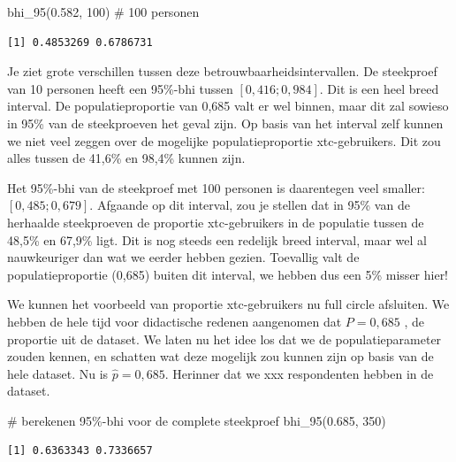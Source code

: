 \documentclass[
  letterpaper,
  DIV=11,
  numbers=noendperiod]{scrreprt}
\newenvironment{Shaded}{\begin{snugshade}}{\end{snugshade}}
\newcommand{\CommentTok}[1]{\textcolor[rgb]{0.37,0.37,0.37}{#1}}
\newcommand{\DecValTok}[1]{\textcolor[rgb]{0.68,0.00,0.00}{#1}}
\newcommand{\FloatTok}[1]{\textcolor[rgb]{0.68,0.00,0.00}{#1}}
\newcommand{\FunctionTok}[1]{\textcolor[rgb]{0.28,0.35,0.67}{#1}}
\newcommand{\NormalTok}[1]{\textcolor[rgb]{0.00,0.23,0.31}{#1}}
\begin{document}
\begin{Shaded}
\begin{Highlighting}[]
\FunctionTok{bhi\_95}\NormalTok{(}\FloatTok{0.582}\NormalTok{, }\DecValTok{100}\NormalTok{) }\CommentTok{\# 100 personen}
\end{Highlighting}
\end{Shaded}

\begin{verbatim}
[1] 0.4853269 0.6786731
\end{verbatim}

Je ziet grote verschillen tussen deze betrouwbaarheidsintervallen. De
steekproef van 10 personen heeft een 95\%-bhi tussen \([0,416; 0,984]\).
Dit is een heel breed interval. De populatieproportie van 0,685 valt er
wel binnen, maar dit zal sowieso in 95\% van de steekproeven het geval
zijn. Op basis van het interval zelf kunnen we niet veel zeggen over de
mogelijke populatieproportie xtc-gebruikers. Dit zou alles tussen de
41,6\% en 98,4\% kunnen zijn.

Het 95\%-bhi van de steekproef met 100 personen is daarentegen veel
smaller: \([0,485; 0,679]\). Afgaande op dit interval, zou je stellen
dat in 95\% van de herhaalde steekproeven de proportie xtc-gebruikers in
de populatie tussen de 48,5\% en 67,9\% ligt. Dit is nog steeds een
redelijk breed interval, maar wel al nauwkeuriger dan wat we eerder
hebben gezien. Toevallig valt de populatieproportie (0,685) buiten dit
interval, we hebben dus een 5\% misser hier!

We kunnen het voorbeeld van proportie xtc-gebruikers nu full circle
afsluiten. We hebben de hele tijd voor didactische redenen aangenomen
dat \(P=0,685\) , de proportie uit de dataset. We laten nu het idee los
dat we de populatieparameter zouden kennen, en schatten wat deze
mogelijk zou kunnen zijn op basis van de hele dataset. Nu is
\(\hat{p}=0,685\). Herinner dat we xxx respondenten hebben in de
dataset.

\begin{Shaded}
\begin{Highlighting}[]
\CommentTok{\# berekenen 95\%{-}bhi voor de complete steekproef}
\FunctionTok{bhi\_95}\NormalTok{(}\FloatTok{0.685}\NormalTok{, }\DecValTok{350}\NormalTok{)}
\end{Highlighting}
\end{Shaded}

\begin{verbatim}
[1] 0.6363343 0.7336657
\end{verbatim}
\end{document}
